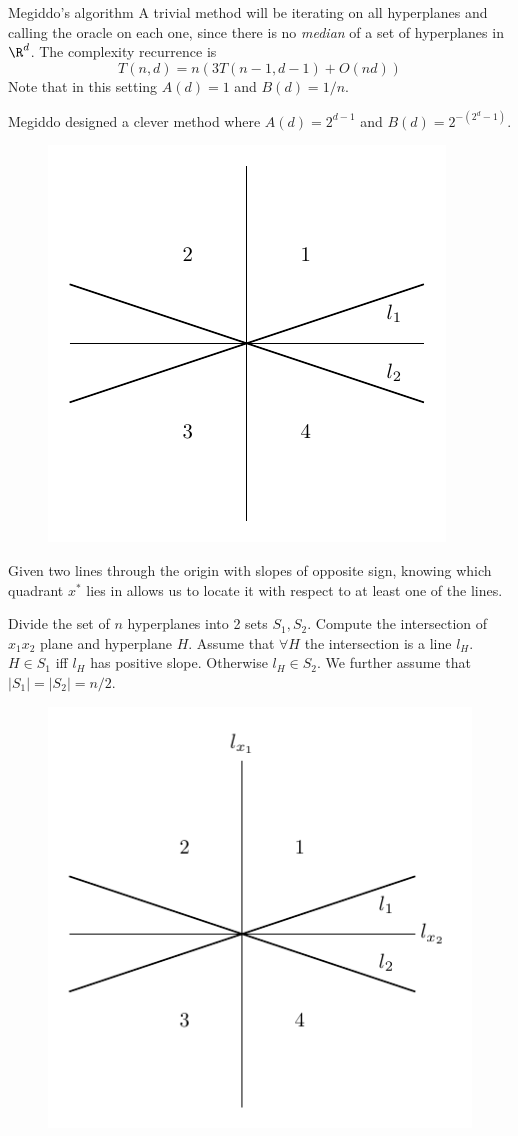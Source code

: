 \documentclass{beamer}
\begin{document}
\begin{frame}[allowframebreaks]{Megiddo's algorithm}
    A trivial method will be iterating on all hyperplanes and calling the oracle on each one, since there is no \emph{median} of a set of hyperplanes in $\R^d$. The complexity recurrence is 
    \[T(n,d)=n(3T(n-1,d-1)+O(nd))\] 
    Note that in this setting $A(d)=1$ and $B(d)=1/n$.

    \newpage
    Megiddo designed a clever method where $A(d)=2^{d-1}$ and $B(d)=2^{-(2^d-1)}$.

    \begin{lemma}
        \begin{figure}
            \includegraphics[width=.3\textwidth]{images/1234.pdf}
        \end{figure}
        Given two lines through the origin with slopes of opposite sign, knowing which quadrant $x^*$ lies in allows us to locate it with respect to at least one of the lines.
    \end{lemma}
    \newpage
    {\scriptsize Divide the set of $n$ hyperplanes into 2 sets $S_1,S_2$. Compute the intersection of $x_1x_2$ plane and hyperplane $H$. Assume that $\forall H$ the intersection is a line $l_H$. $H\in S_1$ iff $l_H$ has positive slope. Otherwise $l_H\in S_2$. We further assume that $|S_1|=|S_2|=n/2$.}
    \noindent
    \begin{minipage}[t]{.5\textwidth}
    \begin{figure}
        \includegraphics[width=.85\textwidth]{images/4l1234.pdf}

\end{figure}
\end{minipage}
\end{frame}
\end{document}
